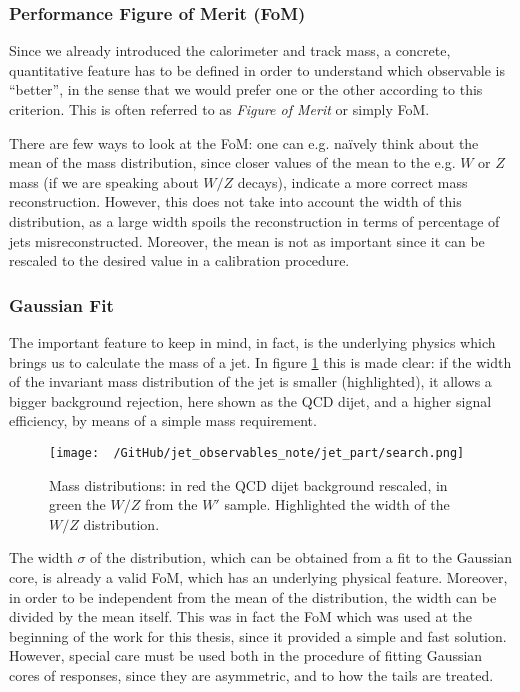 \subsubsection{Performance Figure of Merit (FoM)}
Since we already introduced the calorimeter and track mass, a concrete, quantitative feature has to be defined in order to understand which observable is ``better'', in the sense that we would prefer one or the other according to this criterion. This is often referred to as \textit{Figure of Merit} or simply FoM.

There are few ways to look at the FoM: one can e.g. na\"ively think about the mean of the mass distribution, since closer values of the mean to the e.g. $W$ or $Z$ mass (if we are speaking about $W/Z$ decays), indicate a more correct mass reconstruction. However, this does not take into account the width of this distribution, as a large width spoils the reconstruction in terms of percentage of jets misreconstructed. Moreover, the mean is not as important since it can be rescaled to the desired value in a calibration procedure.

\subsubsection{Gaussian Fit}

The important feature to keep in mind, in fact, is the underlying physics which brings us to calculate the mass of a jet. In figure \ref{fig:search} this is made clear: if the width of the invariant mass distribution of the jet is smaller (highlighted), it allows a bigger background rejection, here shown as the QCD dijet, and a higher signal efficiency, by means of a simple mass requirement.

\begin{figure}[!ht]
  \centering
      \texttt{[image: ~/GitHub/jet\_observables\_note/jet\_part/search.png]}
  \caption[QCD and $W'$ mass distribution]{Mass distributions: in red the QCD dijet background rescaled, in green the $W/Z$ from the $W'$ sample. Highlighted the width of the $W/Z$ distribution.}
  \label{fig:search}
\end{figure}

The width $\sigma$ of the distribution, which can be obtained from a fit to the Gaussian core, is already a valid FoM, which has an underlying physical feature. Moreover, in order to be independent from the mean of the distribution, the width can be divided by the mean itself.
This was in fact the FoM which was used at the beginning of the work for this thesis, since it provided a simple and fast solution. However, special care must be used both in the procedure of fitting Gaussian cores of responses, since they are asymmetric, and to how the tails are treated.

